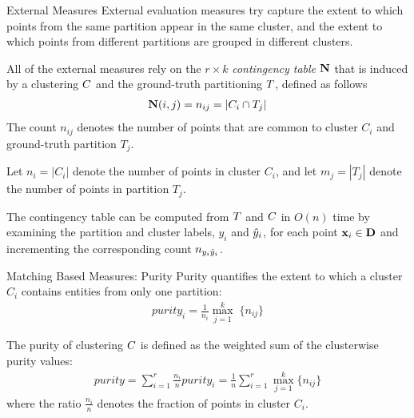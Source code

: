 \begin{frame}{External Measures}
External evaluation measures try
capture the extent to which points from the same partition appear in the
same cluster, and the extent to which points from different partitions
are grouped in different clusters. 

\medskip
All of the external measures rely on the $r\times k$
{\em contingency table} $\mathbf{N}$ that is
induced by a clustering ${\relax C}$ and the ground-truth partitioning ${\relax T}$, def\/{i}ned as follows
\begin{align*}
  \mathbf{N}(i,j) = n_{ij}  = \left| C_i \cap T_{j} \right|
\end{align*}
The count $n_{ij}$ denotes the number of points that are
common to cluster $C_i$ and ground-truth partition $T_{j}$.

\medskip
Let $n_{i} = |C_i|$ denote the number of points in cluster
$C_i$, and let $m_{j} = |T_{j}|$ denote the number of points in partition
$T_{j}$.  

\medskip
The contingency table can be computed from ${\relax T}$ and ${\relax C}$ in
$O(n)$ time by examining the partition and cluster labels, $y_i$ and
$\hat{y}_i$, for each point $\mathbf{x}_i \in \mathbf{D}$ and incrementing the
corresponding count $n_{y_i\hat{y}_i}$.
\end{frame}


\begin{frame}{Matching Based Measures: Purity}
Purity quantif\/{i}es the extent to which a
cluster $C_i$ contains entities from only one partition: 
\begin{align*}
  \mathit{purity}_i = \frac{1}{n_{i}}\max_{j=1}^k\; \{n_{ij}\}
\end{align*}

\bigskip
The purity of clustering ${\relax C}$ is def\/{i}ned as the weighted sum of the
clusterwise purity values:
\begin{align*}
  \mathit{purity} = \sum_{i=1}^r \frac{n_{i}}{n} \mathit{purity}_i =
  \frac{1}{n}\sum_{i=1}^r \max_{j=1}^k \{n_{ij}\}
\end{align*}
where the ratio $\tfrac{n_{i}}{n}$ denotes the fraction of points in
cluster $C_i$.  
\end{frame}


